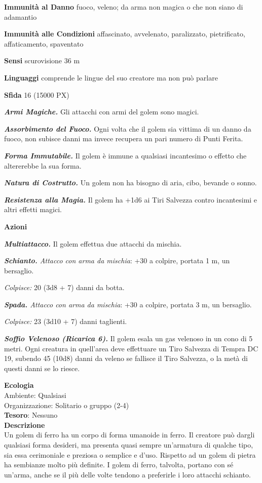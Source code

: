 \begin{multicols}{2}
	\textbf{Immunità al Danno} fuoco, veleno; da arma non magica o che non siano di adamantio

	\textbf{Immunità alle Condizioni} affascinato, avvelenato, paralizzato, pietrificato, affaticamento, spaventato

	\textbf{Sensi} scurovisione 36 m

	\textbf{Linguaggi} comprende le lingue del suo creatore ma non può parlare

	\textbf{Sfida} 16 (15000 PX)

	\textit{\textbf{Armi Magiche.}} Gli attacchi con armi del golem sono magici.

	\textit{\textbf{Assorbimento del Fuoco.}} Ogni volta che il golem sia vittima di un danno da fuoco, non subisce danni ma invece recupera un pari numero di Punti Ferita.

	\textit{\textbf{Forma Immutabile.}} Il golem è immune a qualsiasi incantesimo o effetto che altererebbe la sua forma.

	\textit{\textbf{Natura di Costrutto.}} Un golem non ha bisogno di aria, cibo, bevande o sonno.

	\textit{\textbf{Resistenza alla Magia.}} Il golem ha +1d6 ai Tiri Salvezza contro incantesimi e altri effetti magici.

	\textbf{Azioni}

	\textit{\textbf{Multiattacco.}} Il golem effettua due attacchi da mischia.

	\textit{\textbf{Schianto.} Attacco con arma da mischia}: +30 a colpire, portata 1 m, un bersaglio.

	\textit{Colpisce:} 20 (3d8 + 7) danni da botta.

	\textit{\textbf{Spada.} Attacco con arma da mischia}: +30 a colpire, portata 3 m, un bersaglio.

	\textit{Colpisce:} 23 (3d10 + 7) danni taglienti.

	\textit{\textbf{Soffio Velenoso (Ricarica 6).}} Il golem esala un gas velenoso in un cono di 5 metri. Ogni creatura in quell'area deve effettuare un Tiro Salvezza di Tempra DC 19, subendo 45 (10d8) danni da veleno se fallisce il Tiro Salvezza, o la metà di questi danni se lo riesce.

	\textbf{Ecologia}\\
	Ambiente: Qualsiasi\\
	Organizzazione: Solitario o gruppo (2-4)\\
	\textbf{Tesoro}: Nessuno\\
	\textbf{Descrizione}\\
	Un golem di ferro ha un corpo di forma umanoide in ferro. Il creatore può dargli qualsiasi forma desideri, ma presenta quasi sempre un'armatura di qualche tipo, sia essa cerimoniale e preziosa o semplice e d'uso. Rispetto ad un golem di pietra ha sembianze molto più definite. I golem di ferro, talvolta, portano con sé un'arma, anche se il più delle volte tendono a preferirle i loro attacchi schianto.


\end{multicols}
